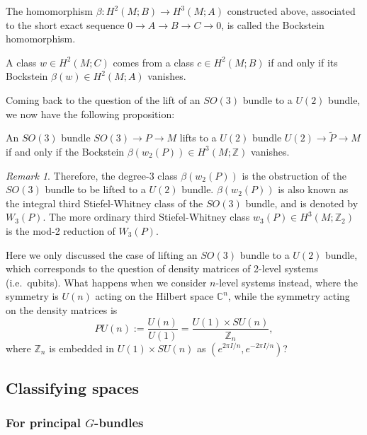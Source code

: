 \documentclass[12pt]{article}
\numberwithin{equation}{section}
\numberwithin{figure}{section}
\theoremstyle{remark}
\newtheorem{remark}[definition]{Remark}
\def\bC{\mathbb{C}}
\def\bZ{\mathbb{Z}}
\begin{document}
\begin{definition}
  The homomorphism $\beta:H^2(M;B)\to H^3(M;A)$
  constructed above, associated to the short exact sequence $0\to A\to B\to C\to 0$,
  is called the Bockstein homomorphism.
\end{definition}

\begin{proposition}
  A class $w\in H^2(M;C)$ comes from a class $c\in H^2(M;B)$
  if and only if its Bockstein $\beta(w)\in H^2(M;A)$ vanishes.
\end{proposition}

Coming back to the question of the lift of an $SO(3)$ bundle to a $U(2)$ bundle,
we now have the following proposition:
\begin{proposition}
  An $SO(3)$ bundle $SO(3)\to P\to M$
  lifts to a $U(2)$ bundle $U(2)\to \tilde P\to M$ if and only if
  the Bockstein $\beta(w_2(P))\in H^3(M;\bZ)$ vanishes.
\end{proposition}

\begin{remark}
Therefore, the degree-3 class $\beta(w_2(P))$ 
is the obstruction of the $SO(3)$ bundle to be lifted to a $U(2)$ bundle.
$\beta(w_2(P))$ is also known as the integral third Stiefel-Whitney class of the $SO(3)$ bundle, 
and is denoted by $W_3(P)$.
The more ordinary third Stiefel-Whitney class $w_3(P)\in H^3(M;\bZ_2)$ is the mod-2 reduction of $W_3(P)$.
\end{remark}

\begin{question}
Here we only discussed the case of lifting an $SO(3)$ bundle to a $U(2)$ bundle,
which corresponds to the question of density matrices of 2-level systems (i.e.~qubits).
What happens when we consider $n$-level systems instead,
where the symmetry is $U(n)$ acting on the Hilbert space $\bC^n$,
while the symmetry acting on the density matrices is \begin{equation}
PU(n):=\frac{U(n)}{U(1)} = \frac{U(1)\times SU(n)}{\bZ_n},
\end{equation}where $\bZ_n$ is embedded in $U(1)\times SU(n)$ as $(e^{2\pi I/n},e^{-2\pi I/n})$?
\end{question}

\subsection{Classifying spaces}
\subsubsection{For principal $G$-bundles}
\end{document}
